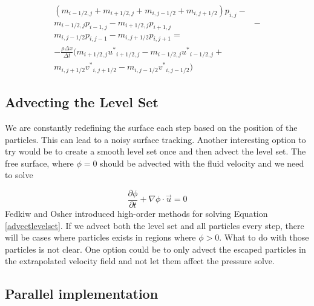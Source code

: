 \begin{equation}
\begin{split}
(m_{i-1/2,j} + m_{i+1/2,j} + m_{i,j-1/2} + m_{i,j+1/2})p_{i,j} - \\ 
m_{i-1/2,j} p_{i-1,j} - 
m_{i+1/2,j}p_{i+1,j} & - \\
m_{i,j-1/2}p_{i,j-1} - 
m_{i,j+1/2}p_{i,j+1} = \\ 
-\frac{\rho \Delta x}{\Delta t}(m_{i+1/2,j}{u^*}_{i+1/2,j} - m_{i-1/2,j}{u^*}_{i-1/2,j} + \\
m_{i,j+1/2}{v^*}_{i,j+1/2} - m_{i,j-1/2} {v^*}_{i,j-1/2})
\end{split}
\label{pressureeqvariational}
\end{equation}

\subsection{Advecting the Level Set}

We are constantly redefining the surface each step based on the position of the particles. This can lead to a noisy surface tracking. Another interesting option to try would be to create a smooth level set once and then advect the level set. The free surface, where $\phi = 0$ should be advected with the fluid velocity and we need to solve

\begin{equation}
\frac{\partial \phi}{\partial t} + \nabla \phi \cdot \vec{u} = 0
\label{advectlevelset}
\end{equation}
\noindent
Fedkiw and Osher \cite{osher} introduced high-order methods for solving Equation \ref{advectlevelset}. If we advect both the level set and all particles every step, there will be cases where particles exists in regions where $\phi > 0$. What to do with those particles is not clear. One option could be to only advect the escaped particles in the extrapolated velocity field and not let them affect the pressure solve.

\subsection{Parallel implementation}


